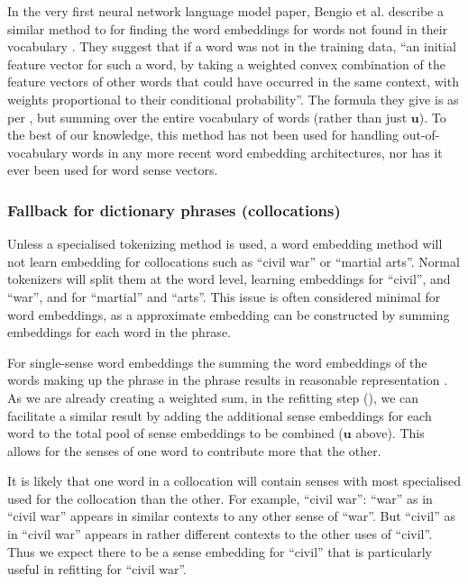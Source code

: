 \documentclass{sig-alternate}
\renewcommand{\u}{\mathbf{u}}
\begin{document}
In the very first neural network language model paper, Bengio et al. describe a similar method to  for finding the word embeddings for words not found in their vocabulary \parencite{NPLM}. They suggest that if a word was not in the training data, \enquote{an initial feature vector for such a word, by taking a weighted convex combination of the feature vectors of other words that could have occurred in the same context, with weights proportional to their conditional probability}. The formula they give is as per , but summing over the entire vocabulary of words (rather than just $\u$). To the best of our knowledge, this method has not been used for handling out-of-vocabulary words in any more recent word embedding architectures, nor has it ever been used for word sense vectors.


\subsubsection {Fallback for dictionary phrases (collocations)}
Unless a specialised tokenizing method is used, a word embedding method will not learn embedding for collocations such as ``civil war'' or ``martial arts''. Normal tokenizers will split them at the word level, learning embeddings for ``civil'', and ``war'', and for ``martial'' and ``arts''. This issue is often considered minimal for word embeddings, as a approximate embedding can be constructed by summing embeddings for each word  in the phrase.

For single-sense word embeddings the summing the word embeddings of the words making up the phrase in the phrase results in reasonable representation \parencite{mikolovSkip, White2015SentVecMeaning}.
As we are already creating a weighted sum, in the refitting step (), we can facilitate a similar result by adding the additional sense embeddings for each word to the total pool of sense embeddings to be combined ($\u$ above). This allows for the senses of one word to contribute more that the other.

It is likely that one word in a collocation will contain senses with most specialised used for the collocation than the other.
For example, \enquote{civil war}: \enquote{war} as in \enquote{civil war} appears in similar contexts to any other sense of \enquote{war}.
But \enquote{civil} as in \enquote{civil war} appears in rather different contexts to the other uses of \enquote{civil}. Thus we expect there to be a sense embedding for \enquote{civil} that is particularly useful in refitting for \enquote{civil war}.
\end{document}
